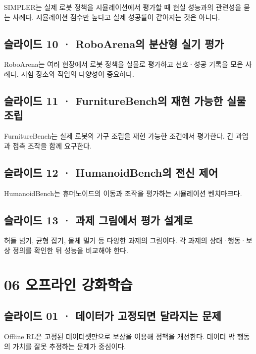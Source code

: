 \documentclass[11pt,a4paper]{article}
\begin{document}
SIMPLER는 실제 로봇 정책을 시뮬레이션에서 평가할 때 현실 성능과의 관련성을 묻는 사례다. 시뮬레이션 점수만 높다고 실제 성공률이 같아지는 것은 아니다.\par

\subsection{슬라이드 10 · RoboArena의 분산형 실기 평가}

RoboArena는 여러 현장에서 로봇 정책을 실물로 평가하고 선호·성공 기록을 모은 사례다. 시험 장소와 작업의 다양성이 중요하다.\par

\subsection{슬라이드 11 · FurnitureBench의 재현 가능한 실물 조립}

FurnitureBench는 실제 로봇의 가구 조립을 재현 가능한 조건에서 평가한다. 긴 과업과 접촉 조작을 함께 요구한다.\par

\subsection{슬라이드 12 · HumanoidBench의 전신 제어}

HumanoidBench는 휴머노이드의 이동과 조작을 평가하는 시뮬레이션 벤치마크다.\par

\subsection{슬라이드 13 · 과제 그림에서 평가 설계로}

허들 넘기, 균형 잡기, 물체 밀기 등 다양한 과제의 그림이다. 각 과제의 상태·행동·보상 정의를 확인한 뒤 성능을 비교해야 한다.\par

\clearpage
\section{06 오프라인 강화학습}


\subsection{슬라이드 01 · 데이터가 고정되면 달라지는 문제}

Offline RL은 고정된 데이터셋만으로 보상을 이용해 정책을 개선한다. 데이터 밖 행동의 가치를 잘못 추정하는 문제가 중심이다.\par
\end{document}
